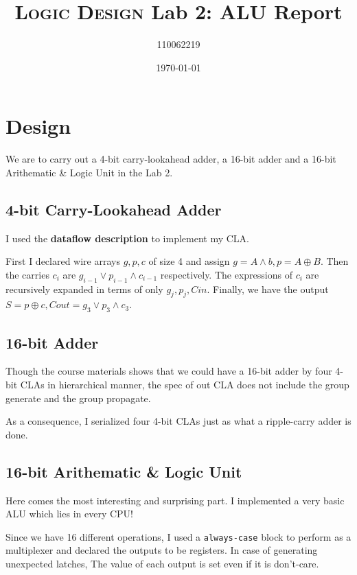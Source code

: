 \documentclass[12pt, a4paper]{article}
\title{\textsc{Logic Design} Lab 2: \textsf{ALU} Report}
\author{110062219}
\date{\today}
\begin{document}
\maketitle

\section{Design}

We are to carry out a 4-bit \textsf{carry-lookahead adder}, a 16-bit \textsf{adder} and a 16-bit \textsf{Arithematic \& Logic Unit} in the Lab 2.

\subsection{4-bit \textsf{Carry-Lookahead Adder}}

I used the \textbf{dataflow description} to implement my \textsf{CLA}.

First I declared wire arrays $g,p,c$ of size 4 and assign $g=A\land b,p=A\oplus B$. Then the carries $c_i$ are $g_{i-1}\lor p_{i-1}\land c_{i-1}$ respectively. The expressions of $c_i$ are recursively expanded in terms of only $g_j,p_j,Cin$. Finally, we have the output $S=p\oplus c,Cout=g_3\lor p_3\land c_3$.

\subsection{16-bit \textsf{Adder}}

Though the course materials shows that we could have a 16-bit \textsf{adder} by four 4-bit \textsf{CLA}s in hierarchical manner, the spec of out \textsf{CLA} does not include the group generate and the group propagate.

As a consequence, I serialized four 4-bit \textsf{CLA}s just as what a ripple-carry adder is done.

\subsection{16-bit \textsf{Arithematic \& Logic Unit}}

Here comes the most interesting and surprising part. I implemented a very basic \textsf{ALU} which lies in every CPU!

Since we have 16 different operations, I used a \texttt{always-case} block to perform as a multiplexer and declared the outputs to be registers. In case of generating unexpected latches, The value of each output is set even if it is don't-care.
\end{document}
